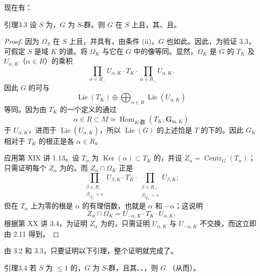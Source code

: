 现在有：
\begin{SGAresult}{引理}{3.3}
设 $S$ 为，$G$ 为 $S$-群。则 $G$ 在 $S$ 上且，其、且。
\end{SGAresult}
\begin{proof}
因为 $\Omega_S$ 在 $S$ 上且，并具有，由条件 (ii)，$G$ 也如此。因此，为验证 3.3，可假定 $S$ 是域 $K$ 的谱。将 $\Omega_K$ 与它在 $G$ 中的像等同。显然，$\Omega_K$ 是 $G$ 的 $T_K$ 及 $U_{\alpha,K}$（$\alpha\in R$）的乘积
\[\prod_{\alpha\in R_-}U_{\alpha,K}\cdot T_K\cdot\prod_{\alpha\in R_+}U_{\alpha,K}.\]
因此 $G$ 的可与
\[\operatorname{Lie}(T_K)\oplus\bigoplus_{\alpha\in R}\operatorname{Lie}(U_{\alpha,K})\]
等同。因为由 $T_K$ 的一个定义的通过
\[\alpha\in R\subset M\simeq\operatorname{Hom}_{K\text{-群}}(T_K,\mathbf G_{\mathrm m,K})\]
于 $U_{\alpha,K}$，进而于 $\operatorname{Lie}(U_{\alpha,K})$，所以 $\operatorname{Lie}(G)$ 的上述恰是 $T$ 的下的。因此 $G_K$ 相对于 $T_K$ 的根正是各 $\alpha\in R$。

应用第 XIX 讲 1.13。设 $T_\alpha$ 为 $\operatorname{Ker}(\alpha)\subset T_K$ 的，并设 $Z_\alpha=\operatorname{Centr}_G(T_\alpha)$；只需证明每个 $Z_\alpha$ 为的。而 $Z_\alpha\cap\Omega_K$ 正是
\[\prod_{\substack{\beta\in R_-\\\beta|_{T_\alpha}=e}}U_{\beta,K}\cdot T_K\cdot\prod_{\substack{\beta\in R_+\\\beta|_{T_\alpha}=e}}U_{\beta,K};\]
但在 $T_\alpha$ 上为零的根是 $\alpha$ 的有理倍数，也就是 $\alpha$ 和 $-\alpha$；这说明
\[Z_\alpha\cap\Omega_K=U_{-\alpha,K}\cdot T_K\cdot U_{\alpha,K}.\]
根据第 XX 讲 3.4，为证明 $Z_\alpha$ 为的，只需证明 $U_{\alpha,K}$ 与 $U_{-\alpha,K}$ 不交换，而这立即由 2.11 得到。
\end{proof}
由 3.2 和 3.3，只要证明以下引理，整个证明就完成了。
\begin{SGAresult}{引理}{3.4}
若 $S$ 为 $\leq1$ 的，$G$ 为 $S$-群，且其、、，则 $G$ （从而）。
\end{SGAresult}
